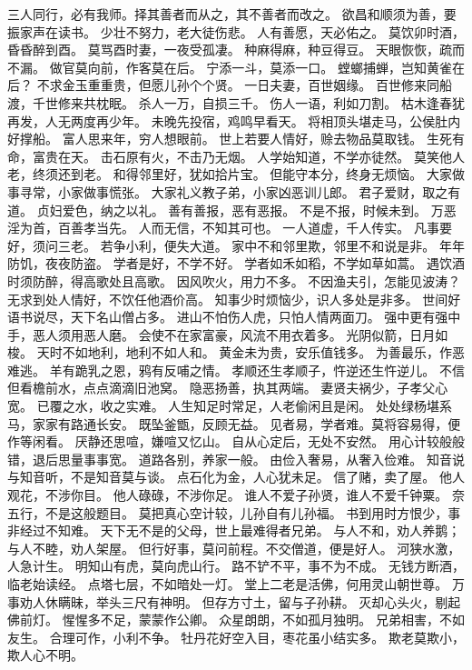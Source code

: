 \documentclass[12pt,UTF8]{ctexbook}
\begin{document}
三人同行，必有我师。择其善者而从之，其不善者而改之。
欲昌和顺须为善，要振家声在读书。
少壮不努力，老大徒伤悲。
人有善愿，天必佑之。
莫饮卯时酒，昏昏醉到酉。
莫骂酉时妻，一夜受孤凄。
种麻得麻，种豆得豆。
天眼恢恢，疏而不漏。
做官莫向前，作客莫在后。
宁添一斗，莫添一口。
螳螂捕蝉，岂知黄雀在后？
不求金玉重重贵，但愿儿孙个个贤。
一日夫妻，百世姻缘。
百世修来同船渡，千世修来共枕眠。
杀人一万，自损三千。
伤人一语，利如刀割。
枯木逢春犹再发，人无两度再少年。
未晚先投宿，鸡鸣早看天。
将相顶头堪走马，公侯肚内好撑船。
富人思来年，穷人想眼前。
世上若要人情好，赊去物品莫取钱。
生死有命，富贵在天。
击石原有火，不击乃无烟。
人学始知道，不学亦徒然。
莫笑他人老，终须还到老。
和得邻里好，犹如拾片宝。
但能守本分，终身无烦恼。
大家做事寻常，小家做事慌张。
大家礼义教子弟，小家凶恶训儿郎。
君子爱财，取之有道。
贞妇爱色，纳之以礼。
善有善报，恶有恶报。
不是不报，时候未到。
万恶淫为首，百善孝当先。
人而无信，不知其可也。
一人道虚，千人传实。
凡事要好，须问三老。
若争小利，便失大道。
家中不和邻里欺，邻里不和说是非。
年年防饥，夜夜防盗。
学者是好，不学不好。
学者如禾如稻，不学如草如蒿。
遇饮酒时须防醉，得高歌处且高歌。
因风吹火，用力不多。
不因渔夫引，怎能见波涛？
无求到处人情好，不饮任他酒价高。
知事少时烦恼少，识人多处是非多。
世间好语书说尽，天下名山僧占多。
进山不怕伤人虎，只怕人情两面刀。
强中更有强中手，恶人须用恶人磨。
会使不在家富豪，风流不用衣着多。
光阴似箭，日月如梭。
天时不如地利，地利不如人和。
黄金未为贵，安乐值钱多。
为善最乐，作恶难逃。
羊有跪乳之恩，鸦有反哺之情。
孝顺还生孝顺子，忤逆还生忤逆儿。
不信但看檐前水，点点滴滴旧池窝。
隐恶扬善，执其两端。
妻贤夫祸少，子孝父心宽。
已覆之水，收之实难。
人生知足时常足，人老偷闲且是闲。
处处绿杨堪系马，家家有路通长安。
既坠釜甑，反顾无益。
见者易，学者难。莫将容易得，便作等闲看。
厌静还思喧，嫌喧又忆山。
自从心定后，无处不安然。
用心计较般般错，退后思量事事宽。
道路各别，养家一般。
由俭入奢易，从奢入俭难。
知音说与知音听，不是知音莫与谈。
点石化为金，人心犹未足。
信了赌，卖了屋。
他人观花，不涉你目。
他人碌碌，不涉你足。
谁人不爱子孙贤，谁人不爱千钟粟。
奈五行，不是这般题目。
莫把真心空计较，儿孙自有儿孙福。
书到用时方恨少，事非经过不知难。
天下无不是的父母，世上最难得者兄弟。
与人不和，劝人养鹅；与人不睦，劝人架屋。
但行好事，莫问前程。不交僧道，便是好人。
河狭水激，人急计生。
明知山有虎，莫向虎山行。
路不铲不平，事不为不成。
无钱方断酒，临老始读经。
点塔七层，不如暗处一灯。
堂上二老是活佛，何用灵山朝世尊。
万事劝人休瞒昧，举头三尺有神明。
但存方寸土，留与子孙耕。
灭却心头火，剔起佛前灯。
惺惺多不足，蒙蒙作公卿。
众星朗朗，不如孤月独明。
兄弟相害，不如友生。
合理可作，小利不争。
牡丹花好空入目，枣花虽小结实多。
欺老莫欺小，欺人心不明。
\end{document}
